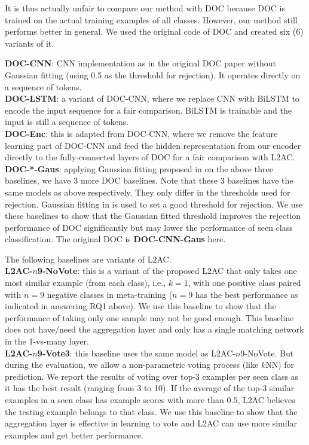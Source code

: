 It is thus actually unfair to compare our method with DOC because DOC is trained on the actual training examples of all classes. However, our method still performs better in general. We used the original code of DOC and created six (6) variants of it.

\vspace{+2mm}
\noindent
\textbf{DOC-CNN}: CNN implementation as in the original DOC paper without Gaussian fitting (using 0.5 as the threshold for rejection). It operates directly on a sequence of tokens. \\
\textbf{DOC-LSTM}: a variant of DOC-CNN, where we replace CNN with BiLSTM to encode the input sequence for a fair comparison. BiLSTM is trainable and the input is still a sequence of tokens. \\
\textbf{DOC-Enc}: this is adapted from DOC-CNN, where we remove the feature learning part of DOC-CNN and feed the hidden representation from our encoder directly to the fully-connected layers of DOC for a fair comparison with L2AC. \\
\textbf{DOC-*-Gaus}: applying Gaussian fitting proposed in \cite{shu-xu-liu:2017:EMNLP2017} on the above three baselines, we have 3 more DOC baselines. 
Note that these 3 baselines have the same models as above respectively. They only differ in the thresholds used for rejection. Gaussian fitting in \cite{shu-xu-liu:2017:EMNLP2017} is used to set a good threshold for rejection. 
We use these baselines to show that the Gaussian fitted threshold improves the rejection performance of DOC significantly but may lower the performance of seen class classification. The original DOC is \textbf{DOC-CNN-Gaus} here. 

\vspace{+1mm}
The following baselines are variants of L2AC.\\
\textbf{L2AC-$n$9-NoVote}: this is a variant of the proposed L2AC that only takes one most similar example (from each class), i.e., $k=1$, with one positive class paired with $n=9$ negative classes in meta-training ($n=9$ has the best performance as indicated in answering RQ1 above). 
We use this baseline to show that the performance of taking only one sample may not be good enough.
This baseline does not have/need the aggregation layer and only has a single matching network in the 1-vs-many layer.\\
\textbf{L2AC-$n$9-Vote3}: this baseline uses the same model as L2AC-$n$9-NoVote. But during the evaluation, we allow a non-parametric voting process (like $k$NN) for prediction. We report the results of voting over top-3 examples per seen class as it has the best result (ranging from 3 to 10). If the average of the top-3 similar examples in a seen class has example scores with more than $0.5$, L2AC believes the testing example belongs to that class.
We use this baseline to show that the aggregation layer is effective in learning to vote and L2AC can use more similar examples and get better performance.\\

